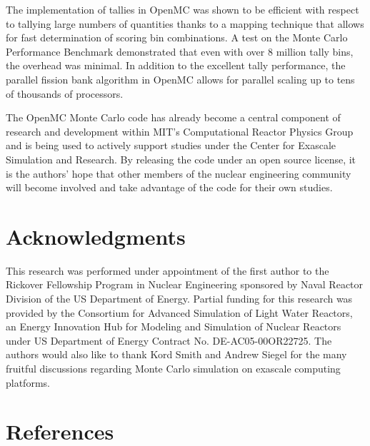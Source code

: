 \documentclass[authoryear,preprint]{elsarticle}
\begin{document}
The implementation of tallies in OpenMC was shown to be efficient with respect
to tallying large numbers of quantities thanks to a mapping technique that
allows for fast determination of scoring bin combinations. A test on the Monte
Carlo Performance Benchmark demonstrated that even with over 8 million tally
bins, the overhead was minimal. In addition to the excellent tally performance,
the parallel fission bank algorithm in OpenMC allows for parallel scaling up to
tens of thousands of processors.

The OpenMC Monte Carlo code has already become a central component of research
and development within MIT's Computational Reactor Physics Group and is being
used to actively support studies under the Center for Exascale Simulation and
Research. By releasing the code under an open source license, it is the authors'
hope that other members of the nuclear engineering community will become
involved and take advantage of the code for their own studies.

\section*{Acknowledgments}

This research was performed under appointment of the first author to the
Rickover Fellowship Program in Nuclear Engineering sponsored by Naval Reactor
Division of the US Department of Energy. Partial funding for this research was
provided by the Consortium for Advanced Simulation of Light Water Reactors, an
Energy Innovation Hub for Modeling and Simulation of Nuclear Reactors under US
Department of Energy Contract No. DE-AC05-00OR22725. The authors would also like
to thank Kord Smith and Andrew Siegel for the many fruitful discussions
regarding Monte Carlo simulation on exascale computing platforms.

\section*{References}



\end{document}
